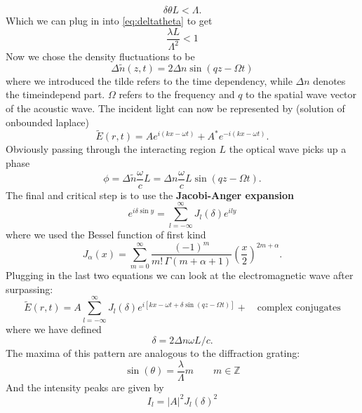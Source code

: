 \begin{equation}
    \delta \theta L < \Lambda.
\end{equation}
Which we can plug in into \eqref{eq:deltatheta} to get
\begin{equation}
    \frac{\lambda L}{\Lambda^2} < 1
\end{equation}
Now we chose the density fluctuations to be 
\begin{equation}
    \Delta \tilde{n}(z,t) = 2 \Delta n \sin(q z - \Omega t)
\end{equation}
where we introduced the tilde refers to the time dependency, while $\Delta n$ denotes the timeindepend part.
$\Omega$ refers to the frequency and $q$ to the spatial wave vector of the acoustic wave.
The incident light can now be represented by (solution of onbounded laplace)
\begin{equation}
    \tilde{E}(r,t) = A e ^{i(kx - \omega t)} + A^{*}e ^{-i(kx - \omega t)}.
\end{equation}
Obviously passing through the interacting region $L$ the optical wave picks up a phase 
\begin{equation}
    \phi = \Delta \tilde{n}\frac{\omega}{c}L = \Delta n \frac{\omega}{c}L \sin (qz - \Omega t).
\end{equation}
The final and critical step is to use the \textbf{Jacobi-Anger expansion}
\begin{equation}
    e^{i\delta \sin y} = \sum_{l = -\infty}^{\infty} J_l(\delta)e^{ily} 
\end{equation}
where we used the Bessel function of first kind
\begin{equation}
J_\alpha(x) = \sum_{m=0}^\infty \frac{(-1)^m}{m! \, \Gamma(m+\alpha+1)} {\left(\frac{x}{2}\right)}^{2m+\alpha}.
\end{equation}
Plugging in the last two equations we can look at the electromagnetic wave after surpassing: 
\begin{equation}
    \tilde{E}(r,t)=A \sum_{l = -\infty}^{\infty} J_l(\delta)e^{i
        \left [kx -\omega t + \delta \sin(qz - \Omega t) \right ]  } + \quad \text{complex conjugates}
\end{equation}
where we have defined
\begin{equation}
    \delta = 2\Delta n \omega L / c.
\end{equation}
The maxima of this pattern are analogous to the diffraction grating:
\begin{equation}
    \sin(\theta) = \frac{\lambda}{\Lambda} m \qquad m \in \mathbb{Z}
\end{equation}
And the intensity peaks are given by
\begin{equation}
    I_l = |A|^2 J_l(\delta)^2
\end{equation}
